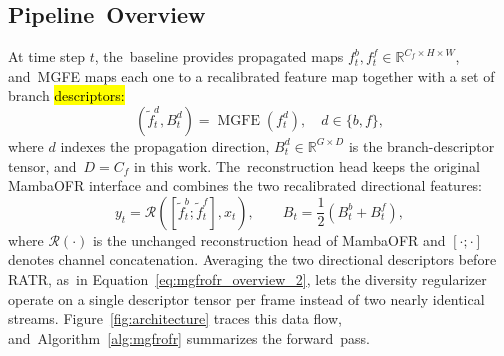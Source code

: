 \documentclass[symmetry,article,accept,pdftex,moreauthors]{Definitions/mdpi}
\begin{document}
\subsection{Pipeline~Overview}
\label{subsec:overview}

At time step $t$, the~baseline provides propagated maps $f_t^{b}, f_t^{f} \in \mathbb{R}^{C_f \times H \times W}$, and~MGFE maps each one to a recalibrated feature map together with a set of branch \hl{descriptors:} %
\begin{equation}
\left(\widetilde{f}_t^{d}, B_t^{d}\right)=\operatorname{MGFE}\!\left(f_t^{d}\right), \quad d \in \{b,f\},
\end{equation}
where $d$ indexes the propagation direction, $B_t^{d} \in \mathbb{R}^{G \times D}$ is the branch-descriptor tensor, and~$D=C_f$ in this work. The~reconstruction head keeps the original MambaOFR interface and combines the two recalibrated directional features:
\begin{equation}
y_t = \mathcal{R}\!\left([\widetilde{f}_t^{b};\widetilde{f}_t^{f}], x_t\right),
\qquad
B_t = \frac{1}{2}\left(B_t^{b}+B_t^{f}\right),
\label{eq:mgfrofr_overview_2}
\end{equation}
where $\mathcal{R}(\cdot)$ is the unchanged reconstruction head of MambaOFR and $[\cdot;\cdot]$ denotes channel concatenation. Averaging the two directional descriptors before RATR, as~in Equation~\eqref{eq:mgfrofr_overview_2}, lets the diversity regularizer operate on a single descriptor tensor per frame instead of two nearly identical streams. Figure~\ref{fig:architecture} traces this data flow, and~Algorithm~\ref{alg:mgfrofr} summarizes the forward~pass.
\end{document}
